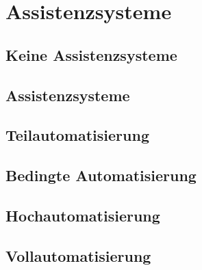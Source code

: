



\section{Assistenzsysteme}
\subsection{Keine Assistenzsysteme}
\subsection{Assistenzsysteme}
\subsection{Teilautomatisierung}
\subsection{Bedingte Automatisierung}
\subsection{Hochautomatisierung}
\subsection{Vollautomatisierung}









